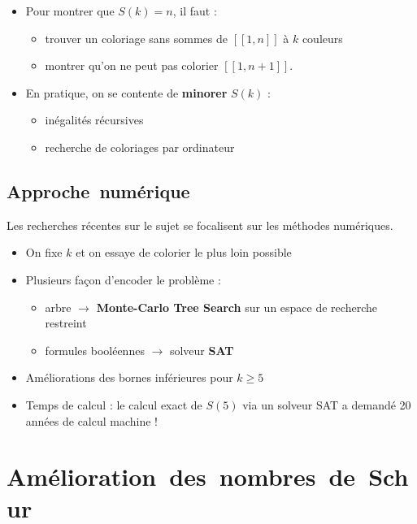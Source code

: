 \documentclass[graphics]{beamer}
\begin{document}
\begin{frame}
	\begin{itemize}
	\item Pour montrer que \(S(k) = n\), il faut : 
	\begin{itemize} 
		\item trouver un coloriage sans sommes de \([\![1,n]\!]\) à \(k\) couleurs
		\item montrer qu'on ne peut pas colorier \([\![1,n+1]\!]\). 
	\end{itemize}
	\pause
	\item En pratique, on se contente de \textbf{minorer} \(S(k)\) :
	\begin{itemize}
	\item inégalités récursives 
	\item recherche de coloriages par ordinateur
	\end{itemize}
	\end{itemize}
\end{frame}

\subsection{Approche~numérique}

\begin{frame}
	Les recherches récentes sur le sujet se focalisent sur les méthodes numériques.
	\begin{itemize}
		\item On fixe \(k\) et on essaye de colorier le plus loin possible
		\item Plusieurs façon d'encoder le problème :
		\begin{itemize}
		\item arbre \(\rightarrow\) \textbf{Monte-Carlo Tree Search} sur un espace de recherche restreint
		\item formules booléennes \(\rightarrow\) solveur \textbf{SAT} 
		\end{itemize}
		\pause
		\item Améliorations des bornes inférieures pour \(k \geq 5\) 
		\item Temps de calcul : le calcul exact de \(S(5)\) via un solveur SAT a demandé 20 années de calcul machine !
	\end{itemize}
	
\end{frame}

\section{Amélioration~des~nombres~de~Schur}
\end{document}
